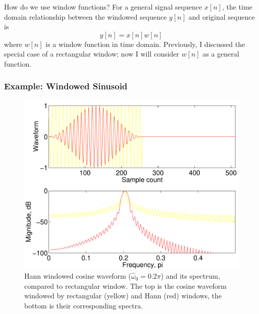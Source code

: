 How do we use window functions? For a general signal sequence $x[n]$,
the time domain relationship between the windowed sequence $y[n]$ and
original sequence is
\begin{equation}
y[n] = x[n] w[n]
\label{eq:ufft-gw}
\end{equation}
where $w[n]$ is a window function in time domain. Previously, I
discussed the special case of a rectangular window; now I will
consider $w[n]$ as a general function.

\subsubsection{Example: Windowed Sinusoid}

\begin{figure}
\centerline{\includegraphics[height=0.35\textheight]{ch-fft/ufft_hannrect_cosx512_256}}
\caption[Hann windowed cosine waveform and its spectrum]{Hann windowed
cosine waveform ($\hat{\omega}_0=0.2\pi$) and its spectrum, compared to
rectangular window. The top is the cosine waveform windowed by
rectangular (yellow) and Hann (red) windows, the bottom is their
corresponding spectra.\label{fig:ufft-hnrt-cosx}}
\end{figure}

